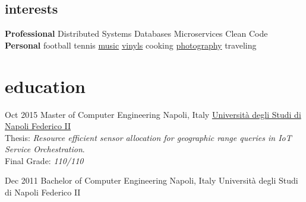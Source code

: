 \begin{aside}
\section{\normalfont interests}
\textbf{Professional}
Distributed Systems
Databases
Microservices
Clean Code
~
\vspace{-0.1cm}
\textbf{Personal}
football
tennis
\href{https://open.spotify.com/user/1171479957}{music}
\href{https://www.discogs.com/user/little_jacket/collection}{vinyls}
cooking
\href{https://www.flickr.com/photos/nicolagiacchetta}{photography}
traveling
~
\end{aside}

\vspace{-0.3cm}
\section{\normalfont education}

\begin{entrylist}
\entry
{Oct 2015}
{Master {\normalfont of Computer Engineering}}
{Napoli, Italy}
{\href{http://www.unina.it/home}{Università degli Studi di Napoli Federico II}}\\
Thesis: \emph{Resource efficient sensor allocation for geographic range queries in IoT Service Orchestration}.\\
Final Grade: \emph{110/110}
\vspace{-.2cm}

\entry
{Dec 2011}
{Bachelor {\normalfont of Computer Engineering}}
{Napoli, Italy}
{Università degli Studi di Napoli Federico II}\\

\end{entrylist}

